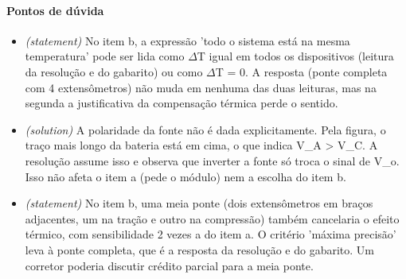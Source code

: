 \documentclass{article}%
\begin{document}
\paragraph{Pontos de dúvida}%
\begin{itemize}%
\item%
\textit{(statement)} No item b, a expressão 'todo o sistema está na mesma temperatura' pode ser lida como $\Delta$T igual em todos os dispositivos (leitura da resolução e do gabarito) ou como $\Delta$T = 0. A resposta (ponte completa com 4 extensômetros) não muda em nenhuma das duas leituras, mas na segunda a justificativa da compensação térmica perde o sentido.%
\item%
\textit{(solution)} A polaridade da fonte não é dada explicitamente. Pela figura, o traço mais longo da bateria está em cima, o que indica V\_A > V\_C. A resolução assume isso e observa que inverter a fonte só troca o sinal de V\_o. Isso não afeta o item a (pede o módulo) nem a escolha do item b.%
\item%
\textit{(statement)} No item b, uma meia ponte (dois extensômetros em braços adjacentes, um na tração e outro na compressão) também cancelaria o efeito térmico, com sensibilidade 2 vezes a do item a. O critério 'máxima precisão' leva à ponte completa, que é a resposta da resolução e do gabarito. Um corretor poderia discutir crédito parcial para a meia ponte.%
\end{itemize}%
\end{document}
